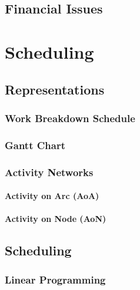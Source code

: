 	\section{Financial Issues} %

\chapter{Scheduling} %

	\section{Representations} %

		\subsection{Work Breakdown Schedule} %

		\subsection{Gantt Chart} %

		\subsection{Activity Networks} %

			\subsubsection{Activity on Arc (AoA)} %

			\subsubsection{Activity on Node (AoN)} %

	\section{Scheduling} %

		\subsection{Linear Programming} %

